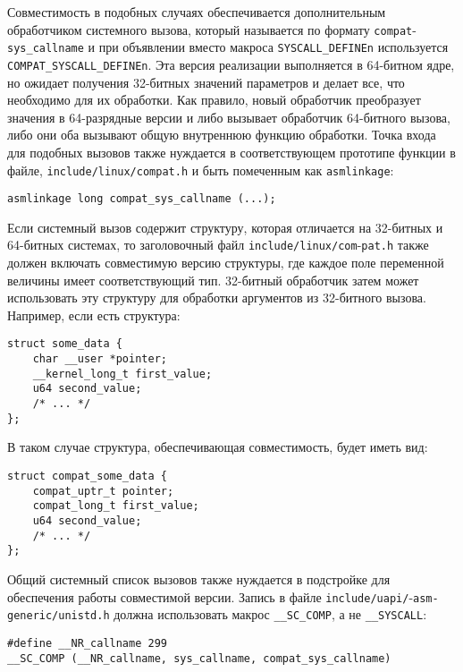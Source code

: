 Совместимость в подобных случаях обеспечивается дополнительным обработчиком
системного вызова, который называется по формату \texttt{compat}-\texttt{sys\_callname} и
при объявлении вместо макроса \texttt{SYSCALL\_DEFINEn} используется
\texttt{COMPAT\_SYSCALL\_DEFINEn}.
Эта версия реализации выполняется в 64-битном ядре,
но ожидает получения 32-битных значений параметров и делает все, что необходимо
для их обработки. Как правило, новый обработчик преобразует значения в
64-разрядные версии и либо вызывает обработчик 64-битного вызова, либо они оба
вызывают общую внутреннюю функцию обработки. Точка входа для подобных вызовов
также нуждается в соответствующем прототипе функции в файле,
\texttt{include/linux/compat.h} и быть помеченным как \texttt{asmlinkage}:

\medskip
\begin{lstlisting}[style=cstyle]
asmlinkage long compat_sys_callname (...);
\end{lstlisting}
\medskip

Если системный вызов содержит структуру, которая отличается на 32-битных и
64-битных системах, то заголовочный файл \texttt{include/linux/com}-\texttt{pat.h} также
должен включать совместимую версию структуры, где каждое поле переменной
величины имеет соответствующий тип. 32-битный обработчик затем может
использовать эту структуру для обработки аргументов из 32-битного вызова.
Например, если есть структура:

\medskip
\begin{lstlisting}[style=cstyle]
struct some_data {
	char __user *pointer;
	__kernel_long_t first_value;
	u64 second_value;
	/* ... */
};
\end{lstlisting}
\medskip

В таком случае структура, обеспечивающая совместимость, будет иметь вид:

\medskip
\begin{lstlisting}[style=cstyle]
struct compat_some_data {
	compat_uptr_t pointer;
	compat_long_t first_value;
	u64 second_value;
	/* ... */
};
\end{lstlisting}
\medskip

Общий системный список вызовов также нуждается в подстройке для обеспечения
работы совместимой версии. Запись в файле \texttt{include/uapi/}-\texttt{asm-generic/unistd.h}
должна использовать макрос \texttt{\_\_SC\_COMP}, а не \texttt{\_\_SYSCALL}:

\medskip
\begin{lstlisting}[style=cstyle]
#define __NR_callname 299
__SC_COMP (__NR_callname, sys_callname, compat_sys_callname)
\end{lstlisting}
\medskip

